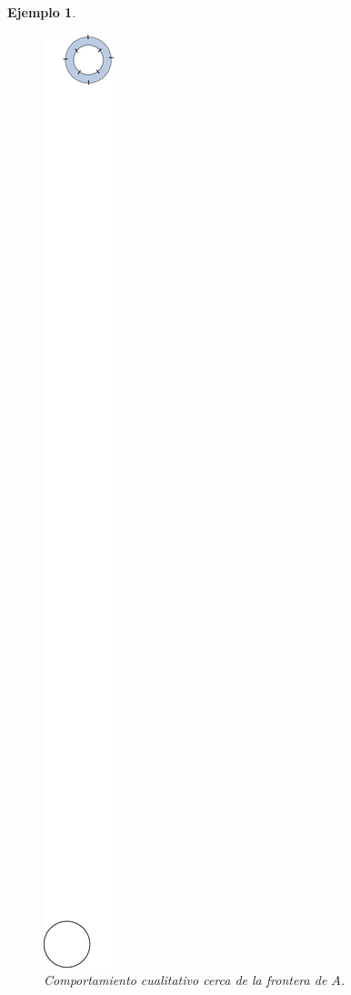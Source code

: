 \documentclass[11pt]{book}
\theoremstyle{definition}
\numberwithin{definition}{section}
\theoremstyle{theorem}
\numberwithin{theorem}{section}
\numberwithin{lemma}{section}
\numberwithin{corollary}{section}
\theoremstyle{plain}
\newtheorem{example}{Ejemplo}
\numberwithin{example}{section}
\begin{document}
\begin{example}
\begin{figure}[!ht] \label{fig:expoincarebendixson2} \centering
	\includegraphics[scale=1.0]{figures/expoincarebendixson2.pdf}
	\caption{Comportamiento cualitativo cerca de la frontera de $A$.}
\end{figure}

\end{example}
\end{document}

